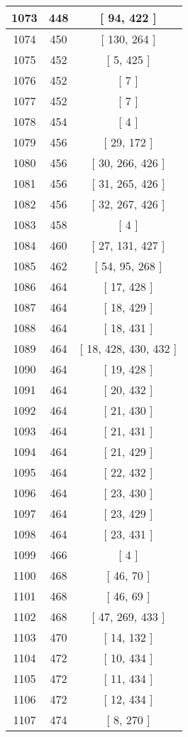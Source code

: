 \begin{center}
\begin{longtable}[H]{|| c c c ||}
\\\hline
1073 & 448 & [ 94, 422 ]
\\\hline
1074 & 450 & [ 130, 264 ]
\\\hline
1075 & 452 & [ 5, 425 ]
\\\hline
1076 & 452 & [ 7 ]
\\\hline
1077 & 452 & [ 7 ]
\\\hline
1078 & 454 & [ 4 ]
\\\hline
1079 & 456 & [ 29, 172 ]
\\\hline
1080 & 456 & [ 30, 266, 426 ]
\\\hline
1081 & 456 & [ 31, 265, 426 ]
\\\hline
1082 & 456 & [ 32, 267, 426 ]
\\\hline
1083 & 458 & [ 4 ]
\\\hline
1084 & 460 & [ 27, 131, 427 ]
\\\hline
1085 & 462 & [ 54, 95, 268 ]
\\\hline
1086 & 464 & [ 17, 428 ]
\\\hline
1087 & 464 & [ 18, 429 ]
\\\hline
1088 & 464 & [ 18, 431 ]
\\\hline
1089 & 464 & [ 18, 428, 430, 432 ]
\\\hline
1090 & 464 & [ 19, 428 ]
\\\hline
1091 & 464 & [ 20, 432 ]
\\\hline
1092 & 464 & [ 21, 430 ]
\\\hline
1093 & 464 & [ 21, 431 ]
\\\hline
1094 & 464 & [ 21, 429 ]
\\\hline
1095 & 464 & [ 22, 432 ]
\\\hline
1096 & 464 & [ 23, 430 ]
\\\hline
1097 & 464 & [ 23, 429 ]
\\\hline
1098 & 464 & [ 23, 431 ]
\\\hline
1099 & 466 & [ 4 ]
\\\hline
1100 & 468 & [ 46, 70 ]
\\\hline
1101 & 468 & [ 46, 69 ]
\\\hline
1102 & 468 & [ 47, 269, 433 ]
\\\hline
1103 & 470 & [ 14, 132 ]
\\\hline
1104 & 472 & [ 10, 434 ]
\\\hline
1105 & 472 & [ 11, 434 ]
\\\hline
1106 & 472 & [ 12, 434 ]
\\\hline
1107 & 474 & [ 8, 270 ]
\\\hline

\end{longtable}
\end{center}
